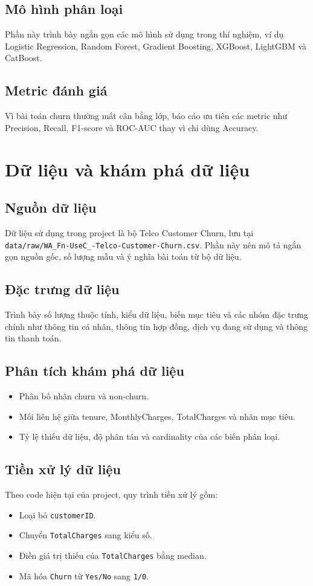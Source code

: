 \documentclass[conference]{IEEEtran}
\begin{document}
\subsection{Mô hình phân loại}
Phần này trình bày ngắn gọn các mô hình sử dụng trong thí nghiệm, ví dụ Logistic Regression, Random Forest, Gradient Boosting, XGBoost, LightGBM và CatBoost.

\subsection{Metric đánh giá}
Vì bài toán churn thường mất cân bằng lớp, báo cáo ưu tiên các metric như Precision, Recall, F1-score và ROC-AUC thay vì chỉ dùng Accuracy.

\section{Dữ liệu và khám phá dữ liệu}
\subsection{Nguồn dữ liệu}
Dữ liệu sử dụng trong project là bộ Telco Customer Churn, lưu tại \texttt{data/raw/WA\_Fn-UseC\_-Telco-Customer-Churn.csv}. Phần này nên mô tả ngắn gọn nguồn gốc, số lượng mẫu và ý nghĩa bài toán từ bộ dữ liệu.

\subsection{Đặc trưng dữ liệu}
Trình bày số lượng thuộc tính, kiểu dữ liệu, biến mục tiêu và các nhóm đặc trưng chính như thông tin cá nhân, thông tin hợp đồng, dịch vụ đang sử dụng và thông tin thanh toán.

\subsection{Phân tích khám phá dữ liệu}
\begin{itemize}
    \item Phân bố nhãn churn và non-churn.
    \item Mối liên hệ giữa tenure, MonthlyCharges, TotalCharges và nhãn mục tiêu.
    \item Tỷ lệ thiếu dữ liệu, độ phân tán và cardinality của các biến phân loại.
\end{itemize}

\subsection{Tiền xử lý dữ liệu}
Theo code hiện tại của project, quy trình tiền xử lý gồm:
\begin{itemize}
    \item Loại bỏ \texttt{customerID}.
    \item Chuyển \texttt{TotalCharges} sang kiểu số.
    \item Điền giá trị thiếu của \texttt{TotalCharges} bằng median.
    \item Mã hóa \texttt{Churn} từ \texttt{Yes/No} sang \texttt{1/0}.
\end{itemize}
\end{document}
